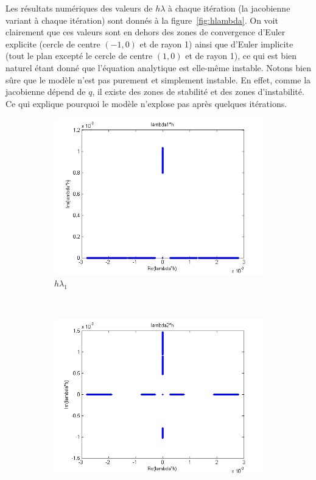 Les résultats numériques des valeurs de $h \lambda$ à chaque itération (la jacobienne variant à chaque itération)
sont donnés à la figure~\ref{fig:hlambda}.
On voit clairement que ces valeurs sont en dehors des zones de convergence d'Euler explicite
(cercle de centre $(-1,0)$ et de rayon 1) ainsi que d'Euler implicite
(tout le plan excepté le cercle de centre $(1,0)$ et de rayon 1),
ce qui est bien naturel étant donné que l'équation analytique est elle-même instable.
Notons bien sûre que le modèle n'est pas purement et simplement instable.
En effet, comme la jacobienne dépend de $q$, il existe des zones de stabilité et des zones d'instabilité.
Ce qui explique pourquoi le modèle n'explose pas après quelques itérations.

\begin{figure}
  \centering
  \begin{subfigure}[b]{0.5\textwidth}
    \includegraphics[width=\textwidth]{images/Q1_hlambda1.png}
    \caption{$h \lambda_1$}
  \end{subfigure}%
  ~ %
  \begin{subfigure}[b]{0.5\textwidth}
    \includegraphics[width=\textwidth]{images/Q1_hlambda2.png}

\end{subfigure}
\end{figure}
